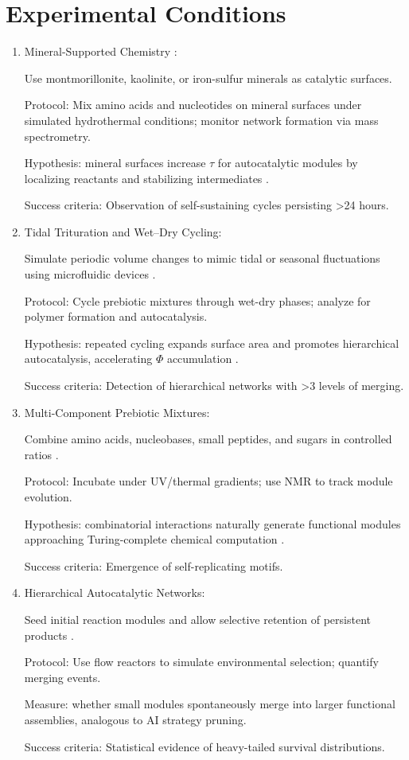 \documentclass[openany]{book}
\begin{document}
\section{Experimental Conditions}
\begin{enumerate}
\item Mineral-Supported Chemistry \citep{hazen2005}:

Use montmorillonite, kaolinite, or iron-sulfur minerals as catalytic surfaces.

Protocol: Mix amino acids and nucleotides on mineral surfaces under simulated hydrothermal conditions; monitor network formation via mass spectrometry.

Hypothesis: mineral surfaces increase $\tau$ for autocatalytic modules by localizing reactants and stabilizing intermediates \citep{adam2012}.

Success criteria: Observation of self-sustaining cycles persisting >24 hours.

\item Tidal Trituration and Wet–Dry Cycling:

Simulate periodic volume changes to mimic tidal or seasonal fluctuations using microfluidic devices \citep{matreux2024}.

Protocol: Cycle prebiotic mixtures through wet-dry phases; analyze for polymer formation and autocatalysis.

Hypothesis: repeated cycling expands surface area and promotes hierarchical autocatalysis, accelerating $\Phi$ accumulation \citep{toppozada2021}.

Success criteria: Detection of hierarchical networks with >3 levels of merging.

\item Multi-Component Prebiotic Mixtures:

Combine amino acids, nucleobases, small peptides, and sugars in controlled ratios \citep{stubbs2020}.

Protocol: Incubate under UV/thermal gradients; use NMR to track module evolution.

Hypothesis: combinatorial interactions naturally generate functional modules approaching Turing-complete chemical computation \citep{bao2022}.

Success criteria: Emergence of self-replicating motifs.

\item Hierarchical Autocatalytic Networks:

Seed initial reaction modules and allow selective retention of persistent products \citep{sokolskyi2024}.

Protocol: Use flow reactors to simulate environmental selection; quantify merging events.

Measure: whether small modules spontaneously merge into larger functional assemblies, analogous to AI strategy pruning.

Success criteria: Statistical evidence of heavy-tailed survival distributions.
\end{enumerate}
\end{document}
